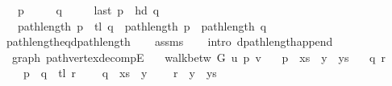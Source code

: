 \begin{isabellebody}
\ \ \ {\isachardoublequoteopen}p\ {\isasymnoteq}\ {\isacharbrackleft}{\kern0pt}{\isacharbrackright}{\kern0pt}{\isachardoublequoteclose}\isanewline
\ \ \ {\isachardoublequoteopen}q\ {\isasymnoteq}\ {\isacharbrackleft}{\kern0pt}{\isacharbrackright}{\kern0pt}{\isachardoublequoteclose}\isanewline
\ \ \ {\isachardoublequoteopen}last\ p\ {\isacharequal}{\kern0pt}\ hd\ q{\isachardoublequoteclose}\isanewline
\ \ \ {\isachardoublequoteopen}path{\isacharunderscore}{\kern0pt}length\ {\isacharparenleft}{\kern0pt}p\ {\isacharat}{\kern0pt}\ tl\ q{\isacharparenright}{\kern0pt}\ {\isacharequal}{\kern0pt}\ path{\isacharunderscore}{\kern0pt}length\ p\ {\isacharplus}{\kern0pt}\ path{\isacharunderscore}{\kern0pt}length\ q{\isachardoublequoteclose}%
\endisataginvisible
{\isafoldinvisible}%
%
\isadeliminvisible
\isanewline
%
\endisadeliminvisible
%
\isadelimproof
\ \ %
\endisadelimproof
%
\isatagproof
{}\isamarkupfalse%
\ path{\isacharunderscore}{\kern0pt}length{\isacharunderscore}{\kern0pt}eq{\isacharunderscore}{\kern0pt}dpath{\isacharunderscore}{\kern0pt}length\isanewline
\ \ \isamarkupfalse%
\ assms\isanewline
\ \ \isamarkupfalse%
\ {\isacharparenleft}{\kern0pt}intro\ dpath{\isacharunderscore}{\kern0pt}length{\isacharunderscore}{\kern0pt}append{\isacharunderscore}{\kern0pt}{}{\isacharparenright}{\kern0pt}%
\endisatagproof
{\isafoldproof}%
%
\isadelimproof
\isanewline
%
\endisadelimproof
%
\isadeliminvisible
\isanewline
%
\endisadeliminvisible
%
\isataginvisible
{}\isamarkupfalse%
\ {\isacharparenleft}{\kern0pt}\ graph{\isacharparenright}{\kern0pt}\ path{\isacharunderscore}{\kern0pt}vertex{\isacharunderscore}{\kern0pt}decompE{\isacharcolon}{\kern0pt}\isanewline
\ \ \ {\isachardoublequoteopen}walk{\isacharunderscore}{\kern0pt}betw\ G\ u\ p\ v{\isachardoublequoteclose}\isanewline
\ \ \ {\isachardoublequoteopen}p\ {\isacharequal}{\kern0pt}\ xs\ {\isacharat}{\kern0pt}\ y\ {\isacharhash}{\kern0pt}\ ys{\isachardoublequoteclose}\isanewline
\ \ \ q\ r\ \isanewline
\ \ \ \ {\isachardoublequoteopen}p\ {\isacharequal}{\kern0pt}\ q\ {\isacharat}{\kern0pt}\ tl\ r{\isachardoublequoteclose}\isanewline
\ \ \ \ {\isachardoublequoteopen}q\ {\isacharequal}{\kern0pt}\ xs\ {\isacharat}{\kern0pt}\ {\isacharbrackleft}{\kern0pt}y{\isacharbrackright}{\kern0pt}{\isachardoublequoteclose}\isanewline
\ \ \ \ {\isachardoublequoteopen}r\ {\isacharequal}{\kern0pt}\ y\ {\isacharhash}{\kern0pt}\ ys{\isachardoublequoteclose}\isanewline

\end{isabellebody}
